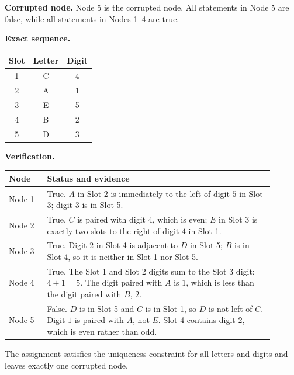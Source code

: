 \begin{caseresponse}
\textbf{Corrupted node.} Node 5 is the corrupted node. All statements in Node 5 are false, while all statements in Nodes 1--4 are true.

\textbf{Exact sequence.}
\begin{center}
\begin{tabular}{ccc}
\toprule
\textbf{Slot} & \textbf{Letter} & \textbf{Digit} \\
\midrule
1 & C & 4 \\
2 & A & 1 \\
3 & E & 5 \\
4 & B & 2 \\
5 & D & 3 \\
\bottomrule
\end{tabular}
\end{center}

\textbf{Verification.}
\begin{center}
\begin{tabular}{p{0.13\linewidth}p{0.77\linewidth}}
\toprule
\textbf{Node} & \textbf{Status and evidence} \\
\midrule
Node 1 & True. \(A\) in Slot 2 is immediately to the left of digit \(5\) in Slot 3; digit \(3\) is in Slot 5. \\
Node 2 & True. \(C\) is paired with digit \(4\), which is even; \(E\) in Slot 3 is exactly two slots to the right of digit \(4\) in Slot 1. \\
Node 3 & True. Digit \(2\) in Slot 4 is adjacent to \(D\) in Slot 5; \(B\) is in Slot 4, so it is neither in Slot 1 nor Slot 5. \\
Node 4 & True. The Slot 1 and Slot 2 digits sum to the Slot 3 digit: \(4+1=5\). The digit paired with \(A\) is \(1\), which is less than the digit paired with \(B\), \(2\). \\
Node 5 & False. \(D\) is in Slot 5 and \(C\) is in Slot 1, so \(D\) is not left of \(C\). Digit \(1\) is paired with \(A\), not \(E\). Slot 4 contains digit \(2\), which is even rather than odd. \\
\bottomrule
\end{tabular}
\end{center}

The assignment satisfies the uniqueness constraint for all letters and digits and leaves exactly one corrupted node.
\end{caseresponse}

\label{fig:corrupted_ai_protocol_case}

\clearpage
